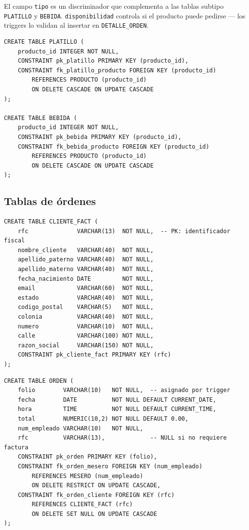 \documentclass[12pt, a4paper]{article}
\begin{document}
El campo \texttt{tipo} es un discriminador que complementa a las tablas subtipo \texttt{PLATILLO} y \texttt{BEBIDA}. \texttt{disponibilidad} controla si el producto puede pedirse --- los triggers lo validan al insertar en \texttt{DETALLE\_ORDEN}.

\begin{lstlisting}[caption={Subtipos de PRODUCTO}]
CREATE TABLE PLATILLO (
    producto_id INTEGER NOT NULL,
    CONSTRAINT pk_platillo PRIMARY KEY (producto_id),
    CONSTRAINT fk_platillo_producto FOREIGN KEY (producto_id)
        REFERENCES PRODUCTO (producto_id)
        ON DELETE CASCADE ON UPDATE CASCADE
);

CREATE TABLE BEBIDA (
    producto_id INTEGER NOT NULL,
    CONSTRAINT pk_bebida PRIMARY KEY (producto_id),
    CONSTRAINT fk_bebida_producto FOREIGN KEY (producto_id)
        REFERENCES PRODUCTO (producto_id)
        ON DELETE CASCADE ON UPDATE CASCADE
);
\end{lstlisting}

\subsection{Tablas de \'ordenes}

\begin{lstlisting}[caption={CLIENTE\_FACT --- solo clientes con factura}]
CREATE TABLE CLIENTE_FACT (
    rfc              VARCHAR(13)  NOT NULL,  -- PK: identificador fiscal
    nombre_cliente   VARCHAR(40)  NOT NULL,
    apellido_paterno VARCHAR(40)  NOT NULL,
    apellido_materno VARCHAR(40)  NOT NULL,
    fecha_nacimiento DATE         NOT NULL,
    email            VARCHAR(60)  NOT NULL,
    estado           VARCHAR(40)  NOT NULL,
    codigo_postal    VARCHAR(5)   NOT NULL,
    colonia          VARCHAR(40)  NOT NULL,
    numero           VARCHAR(10)  NOT NULL,
    calle            VARCHAR(100) NOT NULL,
    razon_social     VARCHAR(150) NOT NULL,
    CONSTRAINT pk_cliente_fact PRIMARY KEY (rfc)
);
\end{lstlisting}

\begin{lstlisting}[caption={ORDEN --- una orden por mesero}]
CREATE TABLE ORDEN (
    folio        VARCHAR(10)   NOT NULL,  -- asignado por trigger
    fecha        DATE          NOT NULL DEFAULT CURRENT_DATE,
    hora         TIME          NOT NULL DEFAULT CURRENT_TIME,
    total        NUMERIC(10,2) NOT NULL DEFAULT 0.00,
    num_empleado VARCHAR(10)   NOT NULL,
    rfc          VARCHAR(13),             -- NULL si no requiere factura
    CONSTRAINT pk_orden PRIMARY KEY (folio),
    CONSTRAINT fk_orden_mesero FOREIGN KEY (num_empleado)
        REFERENCES MESERO (num_empleado)
        ON DELETE RESTRICT ON UPDATE CASCADE,
    CONSTRAINT fk_orden_cliente FOREIGN KEY (rfc)
        REFERENCES CLIENTE_FACT (rfc)
        ON DELETE SET NULL ON UPDATE CASCADE
);
\end{lstlisting}
\end{document}
